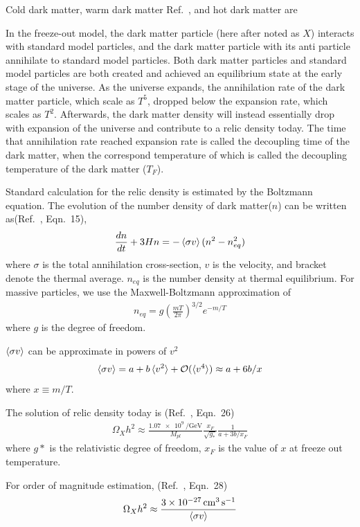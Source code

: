 Cold dark matter, warm dark matter Ref.~\cite{Peacock2003}, and hot dark matter are 

In the freeze-out model, the dark matter particle (here after noted as $X$) interacts with standard model particles, and the dark matter particle with its anti particle annihilate to standard model particles. Both dark matter particles and standard model particles are both created and achieved an equilibrium state at the early stage of the universe. As the universe expands, the annihilation rate of the dark matter particle, which scale as $T^5$, dropped below the expansion rate, which scales as $T^2$. Afterwards, the dark matter density will instead essentially drop with expansion of the universe and contribute to a relic density today. The time that annihilation rate reached expansion rate is called the decoupling time of the dark matter, when the correspond temperature of which is called the decoupling temperature of the dark matter ($T_F$). 

Standard calculation for the relic density is estimated by the Boltzmann equation. The evolution of the number density of dark matter($n$) can be written as(Ref.~\cite{Bertone2005}, Eqn.~15),
\begin{align}
\frac{dn}{dt} + 3 H n = -\braket{\sigma v}(n^2-n_{eq}^2)
\end{align}
where $\sigma$ is the total annihilation cross-section, $v$ is the velocity, and bracket denote the thermal average. $n_{eq}$ is the number density at thermal equilibrium. For massive particles, we use the Maxwell-Boltzmann approximation of
\begin{align}
n_{eq}= g (\frac{mT}{2 \pi})^{3/2} e^{-m/T}
\end{align}
where $g$ is the degree of freedom.

$\braket{\sigma v}$ can be approximate in powers of $v^2$
\begin{align}
\braket{\sigma v} = a+b \braket{v^2} +\mathcal{O}(\braket{v^4}) \approx a+6b/x
\end{align}
where $x \equiv m/T$.

The solution of relic density today is (Ref.~\cite{Bertone2005}, Eqn.~26)
\begin{align}
\Omega_X h^2 \approx \frac{\SI{1.07e9}{\per\GeV}}{M_{pl}}\frac{x_F}{\sqrt{g_*}}\frac{1}{a+3b/x_F}
\end{align}
where $g*$ is the relativistic degree of freedom, $x_F$ is the value of $x$ at freeze out temperature.

For order of magnitude estimation, (Ref.~\cite{Bertone2005}, Eqn.~28)
\begin{align}
\Omega_X h^2 \approx \frac{\SI{3e-27}{\cm\cubed\per\second} }{\braket{\sigma v}}
\end{align}

